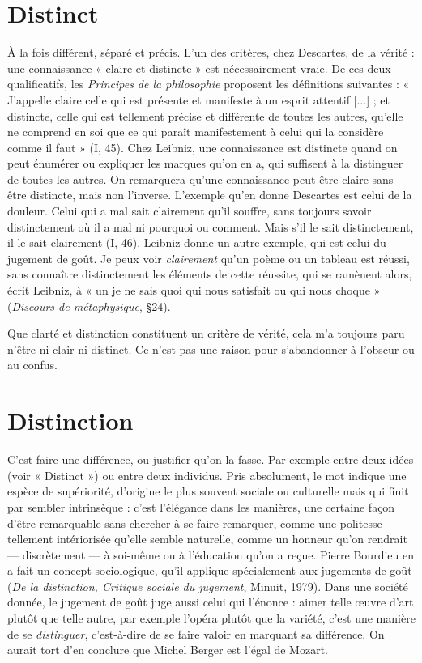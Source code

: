 \section{Distinct}
À la fois différent, séparé et précis. L’un des critères, chez Descartes,
de la vérité : une connaissance « claire et distincte » est
nécessairement vraie. De ces deux qualificatifs, les {\it Principes de la philosophie}
proposent les définitions suivantes : « J’appelle claire celle qui est présente et
manifeste à un esprit attentif [...] ; et distincte, celle qui est tellement précise et
différente de toutes les autres, qu’elle ne comprend en soi que ce qui paraît manifestement
à celui qui la considère comme il faut » (I, 45). Chez Leibniz, une
connaissance est distincte quand on peut énumérer ou expliquer les marques
qu'on en a, qui suffisent à la distinguer de toutes les autres. On remarquera
qu’une connaissance peut être claire sans être distincte, mais non l'inverse.
L'exemple qu’en donne Descartes est celui de la douleur. Celui qui a mal sait clairement
qu'il souffre, sans toujours savoir distinctement où il a mal ni pourquoi
ou comment. Mais s’il le sait distinctement, il le sait clairement (I, 46). Leibniz
donne un autre exemple, qui est celui du jugement de goût. Je peux voir {\it clairement}
qu'un poème ou un tableau est réussi, sans connaître distinctement les éléments
de cette réussite, qui se ramènent alors, écrit Leibniz, à « un je ne sais quoi
qui nous satisfait ou qui nous choque » ({\it Discours de métaphysique}, \S 24).

Que clarté et distinction constituent un critère de vérité, cela m’a toujours
paru n'être ni clair ni distinct. Ce n’est pas une raison pour s’abandonner à
l’obscur ou au confus.

\section{Distinction}
C'est faire une différence, ou justifier qu’on la fasse. Par
exemple entre deux idées (voir « Distinct ») ou entre deux
individus. Pris absolument, le mot indique une espèce de supériorité, d’origine
le plus souvent sociale ou culturelle mais qui finit par sembler intrinsèque :
c’est l'élégance dans les manières, une certaine façon d’être remarquable sans
chercher à se faire remarquer, comme une politesse tellement intériorisée
qu’elle semble naturelle, comme un honneur qu’on rendrait — discrètement — à
soi-même ou à l’éducation qu’on a reçue. Pierre Bourdieu en a fait un concept
sociologique, qu’il applique spécialement aux jugements de goût ({\it De la distinction,
Critique sociale du jugement}, Minuit, 1979). Dans une société donnée, le
jugement de goût juge aussi celui qui l’énonce : aimer telle œuvre d’art plutôt
que telle autre, par exemple l’opéra plutôt que la variété, c’est une manière de
se {\it distinguer}, c’est-à-dire de se faire valoir en marquant sa différence. On aurait
tort d’en conclure que Michel Berger est l’égal de Mozart.

